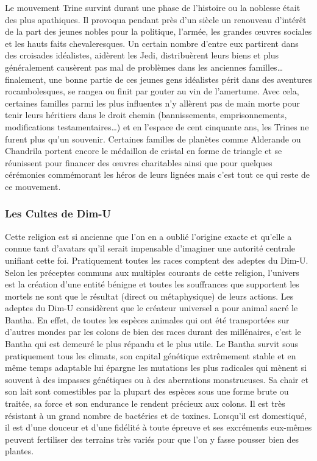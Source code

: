 \documentclass[twoside]{article}
\begin{document}
Le mouvement Trine survint durant une phase de l'histoire ou la noblesse était des plus apathiques. Il provoqua pendant près d'un siècle un renouveau d'intérêt de la part des jeunes nobles pour la politique, l'armée, les grandes œuvres sociales et les hauts faits chevaleresques. Un certain nombre d'entre eux partirent dans des croisades idéalistes, aidèrent les Jedi, distribuèrent leurs biens et plus généralement causèrent pas mal de problèmes dans les anciennes familles\ldots finalement, une bonne partie de ces jeunes gens idéalistes périt dans des aventures rocambolesques, se rangea ou finit par gouter au vin de l'amertume. Avec cela, certaines familles parmi les plus influentes n'y allèrent pas de main morte pour tenir leurs héritiers dans le droit chemin (bannissements, emprisonnements, modifications testamentaires\ldots) et en l'espace de cent cinquante ans, les Trines ne furent plus qu'un souvenir. Certaines familles de planètes comme Alderande ou Chandrila portent encore le médaillon de cristal en forme de triangle et se réunissent pour financer des œuvres charitables ainsi que pour quelques cérémonies commémorant les héros de leurs lignées mais c'est tout ce qui reste de ce mouvement.

\subsubsection{Les Cultes de Dim-U}
Cette religion est si ancienne que l'on en a oublié l'origine exacte et qu'elle a connue tant d'avatars qu'il serait impensable d'imaginer une autorité centrale unifiant cette foi. Pratiquement toutes les races comptent des adeptes du Dim-U. Selon les préceptes communs aux multiples courants de cette religion, l'univers est la création d'une entité bénigne et toutes les souffrances que supportent les mortels ne sont que le résultat (direct ou métaphysique) de leurs actions. Les adeptes du Dim-U considèrent que le créateur universel a pour animal sacré le Bantha. En effet, de toutes les espèces animales qui ont été transportées sur d'autres mondes par les colons de bien des races durant des millénaires, c'est le Bantha qui est demeuré le plus répandu et le plus utile. Le Bantha survit sous pratiquement tous les climats, son capital génétique extrêmement stable et en même temps adaptable lui épargne les mutations les plus radicales qui mènent si souvent à des impasses génétiques ou à des aberrations monstrueuses. Sa chair et son lait sont comestibles par la plupart des espèces sous une forme brute ou traitée, sa force et son endurance le rendent précieux aux colons. Il est très résistant à un grand nombre de bactéries et de toxines. Lorsqu'il est domestiqué, il est d'une douceur et d'une fidélité à toute épreuve et ses excréments eux-mêmes peuvent fertiliser des terrains très variés pour que l'on y fasse pousser bien des plantes.\\
\end{document}
